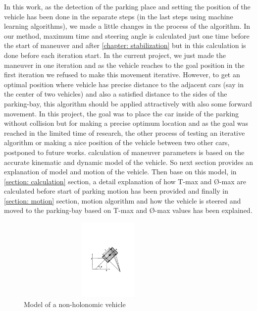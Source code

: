 In this work, as the detection of the parking place and setting the position of the vehicle has been done in the separate steps (in the last steps using machine learning algorithms), we made a little changes in the process of the algorithm. In our method, maximum time and steering angle is calculated just one time before the start of maneuver and after \ref{chapter: stabilization} but in \cite{parkingManeuver} this calculation is done before each iteration start. In the current project, we just made the maneuver in one iteration and as the vehicle reaches to the goal position in the first iteration we refused to make this movement iterative. However, to get an optimal position where vehicle has precise distance to the adjacent cars (say in the center of two vehicles) and also a satisfied distance to the sides of the parking-bay, this algorithm should be applied attractively with also some forward movement. In this project, the goal was to place the car inside of the parking without collision but for making a precise optimum location and as the goal was reached in the limited time of research, the other process of testing an iterative algorithm or making a nice position of the vehicle between two other cars, postponed to future works. calculation of maneuver parameters is based on the accurate kinematic and dynamic model of the vehicle. So next section provides an explanation of model and motion of the vehicle. Then base on this model, in \ref{section: calculation} section, a detail explanation of how T-max and Ø-max are calculated before start of parking motion has been provided and finally in \ref{section: motion} section, motion algorithm and how the vehicle is steered and moved to the parking-bay based on T-max and Ø-max values has been explained.
\begin{figure}
    \centering
    \includegraphics[width=9cm, height=4cm]{images/vehicleModel.pdf}
    \caption{Model of a non-holonomic vehicle \cite{parkingManeuver}}
    \label{fig:vehicleModel}
\end{figure}

